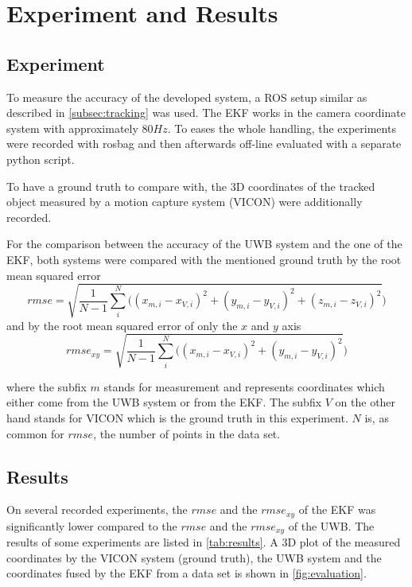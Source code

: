 \chapter{Experiment and Results}

\section{Experiment}
To measure the accuracy of the developed system, a \ac{ROS} setup similar as described in \autoref{subsec:tracking} was used. The \acf{EKF} works in the camera coordinate system with approximately $80\mathit{Hz}$. To eases the whole handling, the experiments were recorded with rosbag and then afterwards off-line evaluated with a separate python script.

To have a ground truth to compare with, the 3D coordinates of the tracked object measured by a motion capture system (VICON) were additionally recorded.

For the comparison between the accuracy of the \ac{UWB} system and the one of the \ac{EKF}, both systems were compared with the mentioned ground truth by the root mean squared error $$\textit{rmse} = \sqrt{\frac{1}{N - 1} \sum_i^N \big( (x_{m,i} - x_{V,i})^2 + (y_{m,i} - y_{V,i})^2 + (z_{m,i} - z_{V,i})^2}\big)$$
and by the root mean squared error of only the $x$ and $y$ axis
$$\textit{rmse}_{xy} = \sqrt{\frac{1}{N - 1} \sum_i^N \big( (x_{m,i} - x_{V,i})^2 + (y_{m,i} - y_{V,i})^2}\big)$$

where the subfix $m$ stands for measurement and represents coordinates which either come from the \ac{UWB} system or from the \ac{EKF}. The subfix $V$ on the other hand stands for VICON which is the ground truth in this experiment. $N$ is, as common for $\textit{rmse}$, the number of points in the data set.

\section{Results}
On several recorded experiments, the $\textit{rmse}$ and the $\textit{rmse}_{xy}$ of the \ac{EKF} was significantly lower compared to the $\textit{rmse}$ and the $\textit{rmse}_{xy}$ of the \ac{UWB}. The results of some experiments are listed in \autoref{tab:results}. A 3D plot of the measured coordinates by the VICON system (ground truth), the \ac{UWB} system and the coordinates fused by the \ac{EKF} from a data set is shown in \autoref{fig:evaluation}.


